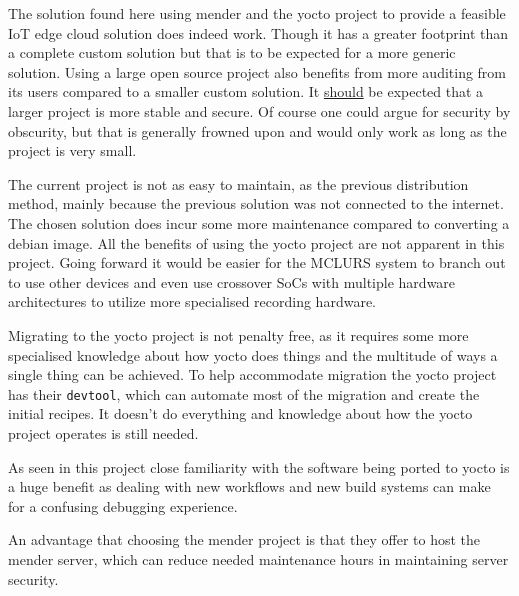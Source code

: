 \documentclass[../../main.tex]{subfiles}
\begin{document}
The solution found here using mender and the yocto project to provide a feasible IoT edge cloud
solution does indeed work. Though it has a greater footprint than a complete custom solution but that
is to be expected for a more generic solution. Using a large open source project  also benefits
from more auditing from its users compared to a smaller custom solution.
It \underline{should} be expected that a larger project is more stable and secure.
Of course one could argue for security by obscurity, but that is generally frowned upon and would
only work as long as the project is very small.


The current project is not as easy to maintain, as the previous distribution method, mainly
because the previous solution was not connected to the internet. The chosen solution does incur
some more maintenance compared to converting a debian image.
All the benefits of using the yocto project are not apparent in this project. Going forward
it would be easier for the MCLURS system to branch out to use other devices and even use crossover
SoCs with multiple hardware architectures to utilize more specialised recording hardware.



Migrating to the yocto project is not penalty free, as it requires some more specialised knowledge
about how yocto does things and the multitude of ways a single thing can be achieved.
To help accommodate migration the yocto project has their \texttt{devtool}, which can automate 
most of the migration and create the initial recipes. It doesn't do everything and knowledge about
how the yocto project operates is still needed.

As seen in this project close familiarity with the software being ported to yocto is a huge benefit
as dealing with new workflows and new build systems can make for a confusing debugging experience.

An advantage that choosing the mender project is that they offer to host the mender server, which
can reduce needed maintenance hours in maintaining server security.
\end{document}
